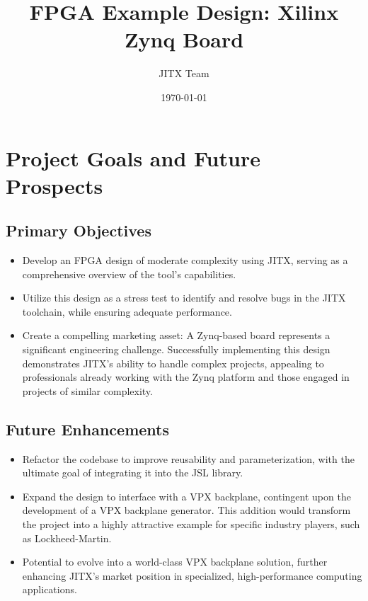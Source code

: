 \documentclass{article}
\title{FPGA Example Design: Xilinx Zynq Board}
\author{JITX Team}
\date{\today}
\begin{document}
\maketitle

\section{Project Goals and Future Prospects}

\subsection{Primary Objectives}
\begin{itemize}
    \item Develop an FPGA design of moderate complexity using JITX, serving as a comprehensive overview of the tool's capabilities.
    \item Utilize this design as a stress test to identify and resolve bugs in the JITX toolchain, while ensuring adequate performance.
    \item Create a compelling marketing asset: A Zynq-based board represents a significant engineering challenge. Successfully implementing this design demonstrates JITX's ability to handle complex projects, appealing to professionals already working with the Zynq platform and those engaged in projects of similar complexity.
\end{itemize}

\subsection{Future Enhancements}
\begin{itemize}
    \item Refactor the codebase to improve reusability and parameterization, with the ultimate goal of integrating it into the JSL library.
    \item Expand the design to interface with a VPX backplane, contingent upon the development of a VPX backplane generator. This addition would transform the project into a highly attractive example for specific industry players, such as Lockheed-Martin.
    \item Potential to evolve into a world-class VPX backplane solution, further enhancing JITX's market position in specialized, high-performance computing applications.
\end{itemize}
\end{document}

